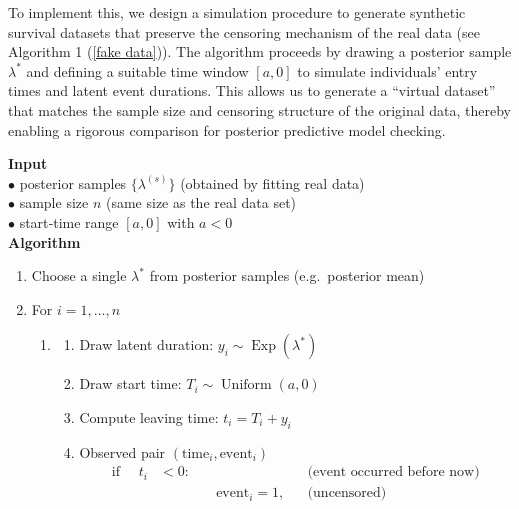 To implement this, we design a simulation procedure to generate synthetic survival datasets that preserve the censoring mechanism of the real data (see Algorithm 1 (\ref{fake data})). The algorithm proceeds by drawing a posterior sample $\lambda^*$ and defining a suitable time window $[a, 0]$ to simulate individuals' entry times and latent event durations. This allows us to generate a “virtual dataset” that matches the sample size and censoring structure of the original data, thereby enabling a rigorous comparison for posterior predictive model checking.
\begin{tcolorbox}[
  title  = Algorithm 1: Simulating a Fake Survival Dataset (e.g.Posterior predictive model checking),
   fonttitle  = \footnotesize,
   fontupper = \footnotesize,
  box align = center, 
  colback = white,
  colframe=black,
  breakable]
\textbf{Input}\\
\quad$\bullet$ posterior samples $\{\lambda^{(s)}\}$ \hfill (obtained by fitting real data)\\
\quad$\bullet$ sample size $n$ \hfill (same size as the real data set)\\
\quad$\bullet$ start‑time range $[a,0]$ with $a<0$ \\[6pt]
\textbf{Algorithm}\par
\begin{enumerate}
  \item Choose a single $\lambda^\ast$ from posterior samples \hfill (e.g.\ posterior mean)
  \item For $i = 1,\dots,n$
         \begin{enumerate}
          \item[] \hspace*{-10pt}%
          \begin{enumerate}
            \item Draw latent duration: $y_i \sim \operatorname{Exp}(\lambda^\ast)$
            \item Draw start time: $T_i \sim \operatorname{Uniform}(a,0)$
            \item Compute leaving time: $t_i = T_i + y_i$
            \item Observed pair $(\text{time}_i,\text{event}_i)$ \[\begin{aligned}
\text{if } \quad t_i &< 0: &&&\text{(event occurred before now)}\\
  &&\quad  \text{event}_i=1, &&\text{(uncensored)}\\ 

\end{aligned}\]
\end{enumerate}
\end{enumerate}
\end{enumerate}
\end{tcolorbox}
